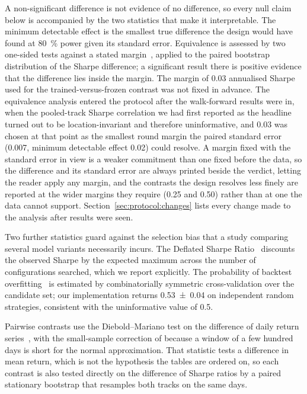 A non-significant difference is not evidence of no difference, so every null
claim below is accompanied by the two statistics that make it interpretable.
The minimum detectable effect is the smallest true difference the design would
have found at \SI{80}{\percent} power given its standard error. Equivalence is
assessed by two one-sided tests against a stated
margin~\citep{schuirmann1987comparison}, applied to the paired bootstrap
distribution of the Sharpe difference; a significant result there is positive
evidence that the difference lies inside the margin. The margin of \num{0.03}
annualised Sharpe used for the trained-versus-frozen contrast was not fixed in
advance. The equivalence analysis entered the protocol after the walk-forward
results were in, when the pooled-track Sharpe correlation we had first reported
as the headline turned out to be location-invariant and therefore uninformative,
and \num{0.03} was chosen at that point as the smallest round margin the paired
standard error (\num{0.007}, minimum detectable effect \num{0.02}) could
resolve. A margin fixed with the standard error in view is a weaker commitment
than one fixed before the data, so the difference and its standard error are
always printed beside the verdict, letting the reader apply any margin, and the
contrasts the design resolves less finely are reported at the wider margins they
require (\num{0.25} and \num{0.50}) rather than at one the data cannot support.
Section~\ref{sec:protocol:changes} lists every change made to the analysis after
results were seen.

Two further statistics guard against the selection bias that a study comparing
several model variants necessarily incurs. The Deflated Sharpe
Ratio~\citep{bailey2014deflated} discounts the observed Sharpe by the expected
maximum across the number of configurations searched, which we report
explicitly. The probability of backtest overfitting~\citep{bailey2017probability}
is estimated by combinatorially symmetric cross-validation over the candidate
set; our implementation returns \num{0.53(4)} on independent random strategies,
consistent with the uninformative value of \num{0.5}.

Pairwise contrasts use the Diebold--Mariano test on the difference of daily
return series~\citep{diebold1995comparing}, with the small-sample correction of
\citet{harvey1997testing} because a window of a few hundred days is short for
the normal approximation. That statistic tests a difference in mean return,
which is not the hypothesis the tables are ordered on, so each contrast is also
tested directly on the difference of Sharpe ratios by a paired stationary
bootstrap that resamples both tracks on the same days.

